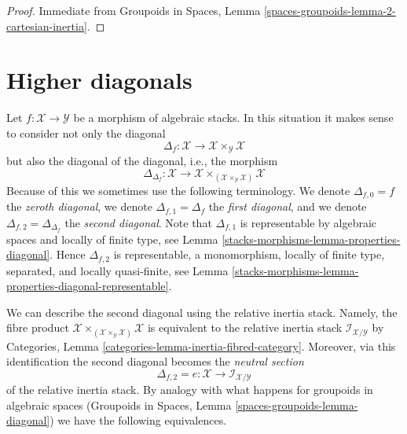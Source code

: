 \begin{proof}
Immediate from
Groupoids in Spaces, Lemma \ref{spaces-groupoids-lemma-2-cartesian-inertia}.
\end{proof}

\section{Higher diagonals}
\label{stacks-morphisms-section-higher-diagonals}
Let $f : \mathcal{X} \to \mathcal{Y}$ be a morphism of algebraic stacks.
In this situation it makes sense to consider not only the diagonal
$$
\Delta_f : \mathcal{X} \to \mathcal{X} \times_\mathcal{Y} \mathcal{X}
$$
but also the diagonal of the diagonal, i.e., the morphism
$$
\Delta_{\Delta_f} :
\mathcal{X}
\longrightarrow
\mathcal{X} \times_{(\mathcal{X} \times_\mathcal{Y} \mathcal{X})} \mathcal{X}
$$
Because of this we sometimes use the following terminology. We denote
$\Delta_{f, 0} = f$ the {\it zeroth diagonal},
we denote $\Delta_{f, 1} = \Delta_f$ the {\it first diagonal}, and
we denote $\Delta_{f, 2} = \Delta_{\Delta_f}$ the {\it second diagonal}.
Note that $\Delta_{f, 1}$ is representable by algebraic spaces and locally of
finite type, see
Lemma \ref{stacks-morphisms-lemma-properties-diagonal}.
Hence $\Delta_{f, 2}$ is representable, a monomorphism, locally of finite type,
separated, and locally quasi-finite, see
Lemma \ref{stacks-morphisms-lemma-properties-diagonal-representable}.

\medskip\noindent
We can describe the second diagonal using the relative inertia stack.
Namely, the fibre product
$\mathcal{X}
\times_{(\mathcal{X} \times_\mathcal{Y} \mathcal{X})} \mathcal{X}$
is equivalent to the relative inertia stack
$\mathcal{I}_{\mathcal{X}/\mathcal{Y}}$ by
Categories, Lemma \ref{categories-lemma-inertia-fibred-category}.
Moreover, via this identification the second diagonal becomes the
{\it neutral section}
$$
\Delta_{f, 2} = e : \mathcal{X} \to \mathcal{I}_{\mathcal{X}/\mathcal{Y}}
$$
of the relative inertia stack. By analogy with what happens for
groupoids in algebraic spaces
(Groupoids in Spaces, Lemma \ref{spaces-groupoids-lemma-diagonal})
we have the following equivalences.

